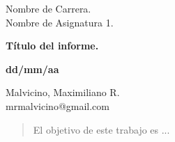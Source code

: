\documentclass[a4paper,12pt]{article}
\begin{document}
\begin{center}
    
    \vspace{5cm} %
    \begin{Large}
        Nombre de Carrera.
        \\ \vspace{1cm}
        Nombre de Asignatura 1.
    \end{Large}
    \vspace{2cm}

    \begin{Huge}
        \textbf{Título del informe.}
    \end{Huge}

    \vspace{1cm}
    \textbf{dd/mm/aa}
    \vspace{5cm} %

    \begin{Large}
        Malvicino, Maximiliano R. \\ mrmalvicino@gmail.com
        
    \end{Large}

\end{center}


\clearpage

\begin{abstract}
    El objetivo de este trabajo es ...
    


\end{abstract}

\clearpage

\tableofcontents
\end{document}

